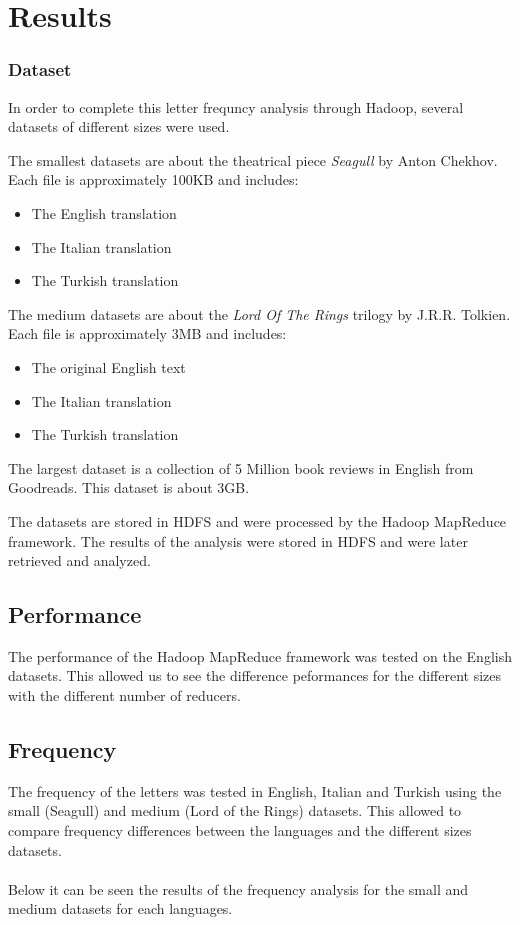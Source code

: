 \chapter{Results}

\subsection{Dataset}
In order to complete this letter frequncy analysis through Hadoop, several datasets of different sizes were used. 

The smallest datasets are about the theatrical piece \textit{Seagull} by Anton Chekhov. Each file is approximately 100KB and includes: 
\begin{itemize}
    \item The English translation
    \item The Italian translation
    \item The Turkish translation
\end{itemize}

The medium datasets are about the \textit{Lord Of The Rings} trilogy by J.R.R. Tolkien. Each file is approximately 3MB and includes: 
\begin{itemize}
    \item The original English text
    \item The Italian translation
    \item The Turkish translation
\end{itemize}

The largest dataset is a collection of 5 Million book reviews in English from Goodreads. This dataset is about 3GB. 
 
The datasets are stored in HDFS and were processed by the Hadoop MapReduce framework. The results of the analysis were stored in HDFS and were later retrieved and analyzed.

\section{Performance}
The performance of the Hadoop MapReduce framework was tested on the English datasets. This allowed us to see the difference peformances for the different sizes with the different number of reducers.

\newpage

\section{Frequency}
The frequency of the letters was tested in English, Italian and Turkish using the small (Seagull) and medium (Lord of the Rings) datasets. 
This allowed to compare frequency differences between the languages and the different sizes datasets.\\ \\
Below it can be seen the results of the frequency analysis for the small and medium datasets for each languages.

